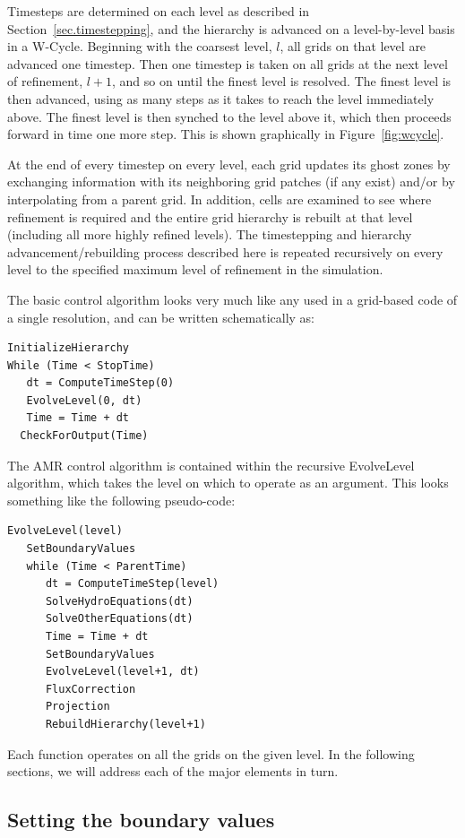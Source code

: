 Timesteps are determined on each level as described in Section~\ref{sec.timestepping}, and the hierarchy is advanced on
a level-by-level basis in a W-Cycle.    Beginning with the coarsest level, $l$, all grids on that level are advanced one
timestep.  Then one timestep is taken on all grids at the next level of refinement, $l+1$, and so on until the finest level is resolved. The finest level is then advanced, using as many steps as it takes to reach the level immediately above.  The finest level is then synched to the level above it, which then proceeds forward in time one more step.  This is shown graphically in Figure~\ref{fig:wcycle}.

At the end of every timestep on every level, each grid updates its ghost zones by exchanging information with its neighboring grid patches (if any exist) and/or by interpolating from a parent grid.  In addition, cells are examined to see where refinement is required and the entire grid hierarchy is rebuilt at that level (including all more highly refined levels).  The timestepping and hierarchy advancement/rebuilding process described here is repeated recursively on every level to the specified maximum level of refinement in the simulation. 

The basic control algorithm looks very much like any used in a grid-based code of a single resolution, and can be written schematically as:
\begin{verbatim}
InitializeHierarchy
While (Time < StopTime)
   dt = ComputeTimeStep(0)
   EvolveLevel(0, dt)
   Time = Time + dt
  CheckForOutput(Time)
\end{verbatim}
The AMR control algorithm is contained within the recursive
EvolveLevel algorithm, which takes the level on which to operate as an
argument.  This looks something like the following pseudo-code:
\begin{verbatim}
EvolveLevel(level)
   SetBoundaryValues
   while (Time < ParentTime)
      dt = ComputeTimeStep(level)
      SolveHydroEquations(dt)
      SolveOtherEquations(dt)
      Time = Time + dt
      SetBoundaryValues
      EvolveLevel(level+1, dt)
      FluxCorrection
      Projection
      RebuildHierarchy(level+1)
\end{verbatim}

Each function operates on all the grids on the given level.  In the following sections, we will address each of the major elements in turn.

\subsection{Setting the boundary values}
\label{sec:interpolation}

